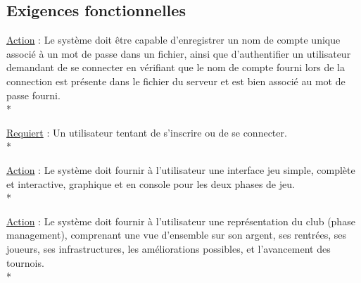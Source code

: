 \documentclass[a4paper]{article}
\begin{document}
	\subsection{Exigences fonctionnelles}
		\begin{description}[style=nextline]
			\item[Vérification d'authentification :]
			\begin{description}[leftmargin=*] %
				\item[]
				\item \underline{Action} : Le système doit être capable d'enregistrer un nom de compte unique associé à un mot de passe dans un fichier, ainsi que d'authentifier un utilisateur demandant de se connecter en vérifiant que le nom de compte fourni lors de la connection est présente dans le fichier du serveur et est bien associé au mot de passe fourni.\\*
				\item \underline{Requiert} : Un utilisateur tentant de s'inscrire ou de se connecter.\\*
			\end{description} %
			
			\item[Interface :]
			\begin{description}[leftmargin=*] %
				\item[]
				\item \underline{Action} : Le système doit fournir à l'utilisateur une interface jeu simple, complète et interactive, graphique et en console pour les deux phases de jeu.\\*
			\end{description} %
			
			\item[Représentation phase management :]
			\begin{description}[leftmargin=*] %
				\item[]
				\item \underline{Action} : Le système doit fournir à l'utilisateur une représentation du \gls{club} (phase management), comprenant une vue d'ensemble sur son argent, ses rentrées, ses joueurs, ses infrastructures, les améliorations possibles, et l'avancement des tournois.\\*
			\end{description} %
			

\end{description}
\end{document}
